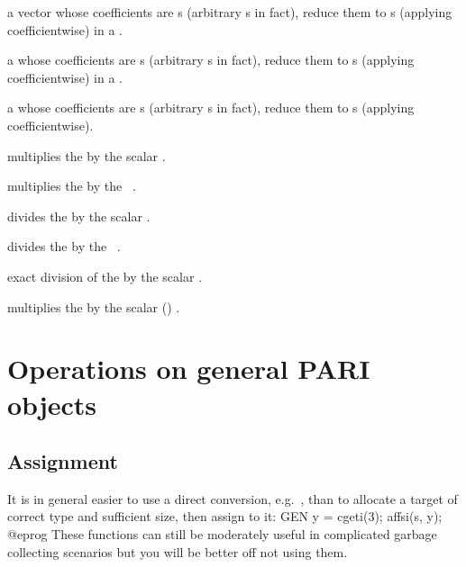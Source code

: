   a vector whose
coefficients are s (arbitrary s in fact), reduce them to
s (applying  coefficientwise) in a .

  a  whose
coefficients are s (arbitrary s in fact), reduce them to
s (applying  coefficientwise) in a .

  a  whose
coefficients are s (arbitrary s in fact), reduce them to
s (applying  coefficientwise).


 multiplies the  
by the scalar .

 multiplies the  
by the ~.

 divides the  
by the scalar .

 divides the  
by the ~.

 exact division of the 
 by the scalar .

 multiplies the 
 by the scalar () .





\newpage
\chapter{Operations on general PARI objects}

\section{Assignment}

It is in general easier to use a direct conversion,
e.g.~, than to allocate a target of correct type and
sufficient size, then assign to it:
\bprog
  GEN y = cgeti(3); affsi(s, y);
@eprog\noindent
These functions can still be moderately useful in complicated garbage
collecting scenarios but you will be better off not using them.

